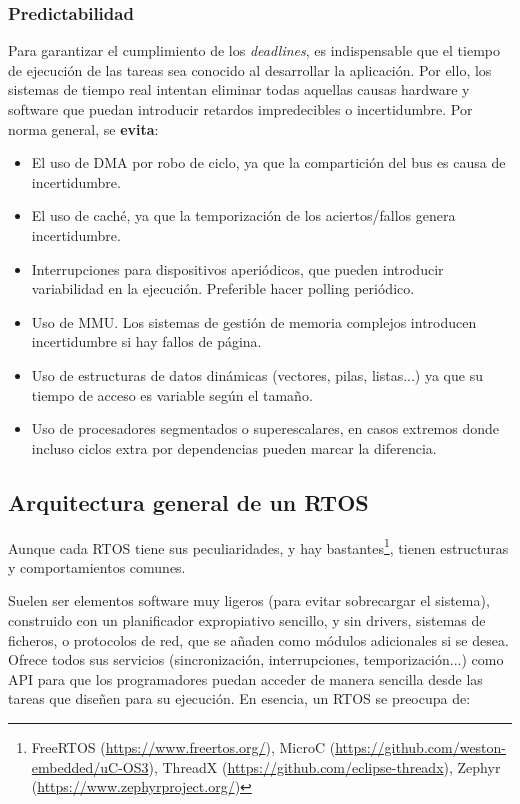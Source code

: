 \documentclass[../main.tex]{subfiles}
\begin{document}
        \subsubsection{Predictabilidad}

        Para garantizar el cumplimiento de los \textit{deadlines}, es indispensable que el tiempo de ejecución de las tareas sea conocido al desarrollar la aplicación. Por ello, los sistemas de tiempo real intentan eliminar todas aquellas causas hardware y software que puedan introducir retardos impredecibles o incertidumbre. Por norma general, se \textbf{evita}:

        \begin{itemize}
            \item El uso de DMA por robo de ciclo, ya que la compartición del bus es causa de incertidumbre.
            \item El uso de caché, ya que la temporización de los aciertos/fallos genera incertidumbre.
            \item Interrupciones para dispositivos aperiódicos, que pueden introducir variabilidad en la ejecución. Preferible hacer polling periódico.
            \item Uso de MMU. Los sistemas de gestión de memoria complejos introducen incertidumbre si hay fallos de página.
            \item Uso de estructuras de datos dinámicas (vectores, pilas, listas...) ya que su tiempo de acceso es variable según el tamaño.
            \item Uso de procesadores segmentados o superescalares, en casos extremos donde incluso ciclos extra por dependencias pueden marcar la diferencia.
        \end{itemize}


    \subsection{Arquitectura general de un RTOS}

        Aunque cada RTOS tiene sus peculiaridades, y hay bastantes\footnote{FreeRTOS (\url{https://www.freertos.org/}), MicroC (\url{https://github.com/weston-embedded/uC-OS3}), ThreadX (\url{https://github.com/eclipse-threadx}), Zephyr (\url{https://www.zephyrproject.org/})}, tienen estructuras y comportamientos comunes. 

        Suelen ser elementos software muy ligeros (para evitar sobrecargar el sistema), construido con un planificador expropiativo sencillo, y sin drivers, sistemas de ficheros, o protocolos de red, que se añaden como módulos adicionales si se desea. Ofrece todos sus servicios (sincronización, interrupciones, temporización...) como API para que los programadores puedan acceder de manera sencilla desde las tareas que diseñen para su ejecución. En esencia, un RTOS se preocupa de:
\end{document}
